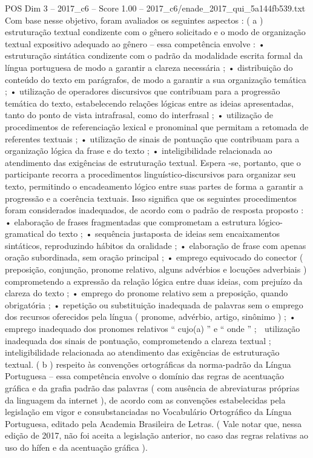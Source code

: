 \begin{textsample}{POS Dim 3 – 2017\_c6 – Score 1.00 – 2017\_c6/enade\_2017\_qui\_5a144fb539.txt}
Com base nesse objetivo, foram avaliados os seguintes aspectos : ( a ) estruturação textual condizente com o gênero solicitado e o modo de organização textual expositivo adequado ao gênero – essa competência envolve : • estruturação sintática condizente com o padrão da modalidade escrita formal da língua portuguesa de modo a garantir a clareza necessária ; • distribuição do conteúdo do texto em parágrafos, de modo a garantir a sua organização temática ; • utilização de operadores discursivos que contribuam para a progressão temática do texto, estabelecendo relações lógicas entre as ideias apresentadas, tanto do ponto de vista intrafrasal, como do interfrasal ; • utilização de procedimentos de referenciação lexical e pronominal que permitam a retomada de referentes textuais ; • utilização de sinais de pontuação que contribuam para a organização lógica da frase e do texto ; • inteligibilidade relacionada ao atendimento das exigências de estruturação textual.
Espera -se, portanto, que o participante recorra a procedimentos linguístico-discursivos para organizar seu texto, permitindo o encadeamento lógico entre suas partes de forma a garantir a progressão e a coerência textuais.
Isso significa que os seguintes procedimentos foram considerados inadequados, de acordo com o padrão de resposta proposto : • elaboração de frases fragmentadas que comprometam a estrutura lógico-gramatical do texto ; • sequência justaposta de ideias sem encaixamentos sintáticos, reproduzindo hábitos da oralidade ; • elaboração de frase com apenas oração subordinada, sem oração principal ; • emprego equivocado do conector ( preposição, conjunção, pronome relativo, alguns advérbios e locuções adverbiais ) comprometendo a expressão da relação lógica entre duas ideias, com prejuízo da clareza do texto ; • emprego do pronome relativo sem a preposição, quando obrigatória ; • repetição ou substituição inadequada de palavras sem o emprego dos recursos oferecidos pela língua ( pronome, advérbio, artigo, sinônimo ) ; • emprego inadequado dos pronomes relativos “ cujo(a) ” e “ onde ” ;  utilização inadequada dos sinais de pontuação, comprometendo a clareza textual ;  inteligibilidade relacionada ao atendimento das exigências de estruturação textual. ( b ) respeito às convenções ortográficas da norma-padrão da Língua Portuguesa – essa competência envolve o domínio das regras de acentuação gráfica e da grafia padrão das palavras ( com ausência de abreviaturas próprias da linguagem da internet ), de acordo com as convenções estabelecidas pela legislação em vigor e consubstanciadas no Vocabulário Ortográfico da Língua Portuguesa, editado pela Academia Brasileira de Letras. ( Vale notar que, nessa edição de 2017, não foi aceita a legislação anterior, no caso das regras relativas ao uso do hífen e da acentuação gráfica ).

\end{textsample}
